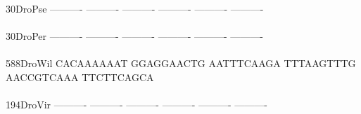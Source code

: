 \documentclass[11pt,twoside,reqno,a4paper]{article}
\begin{document}
{30\hspace*{3\charwidth}DroPse	----------	----------	----------	----------	----------	----------	\\
\hspace*{5\charwidth}\hspace*{7\charwidth}\hspace*{1\charwidth}\hspace*{1\charwidth}\hspace*{1\charwidth}\hspace*{1\charwidth}\hspace*{1\charwidth}\hspace*{1\charwidth}\\
30\hspace*{3\charwidth}DroPer	----------	----------	----------	----------	----------	----------	\\
\hspace*{5\charwidth}\hspace*{7\charwidth}\hspace*{1\charwidth}\hspace*{1\charwidth}\hspace*{1\charwidth}\hspace*{1\charwidth}\hspace*{1\charwidth}\hspace*{1\charwidth}\\
588\hspace*{2\charwidth}DroWil	CACAAAAAAT	GGAGGAACTG	AATTTCAAGA	TTTAAGTTTG	AACCGTCAAA	TTCTTCAGCA	\\
\hspace*{5\charwidth}\hspace*{7\charwidth}\hspace*{1\charwidth}\hspace*{1\charwidth}\hspace*{1\charwidth}\hspace*{1\charwidth}\hspace*{1\charwidth}\hspace*{1\charwidth}\\
194\hspace*{2\charwidth}DroVir	----------	----------	----------	----------	----------	----------	\\
\hspace*{5\charwidth}\hspace*{7\charwidth}\hspace*{1\charwidth}\hspace*{1\charwidth}\hspace*{1\charwidth}\hspace*{1\charwidth}\hspace*{1\charwidth}\hspace*{1\charwidth}\\
}
\end{document}
